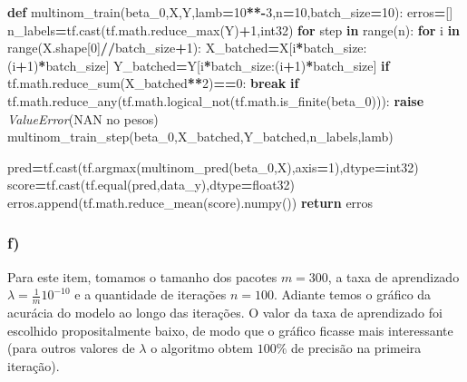 \documentclass[
]{article}
\newenvironment{Shaded}{\begin{snugshade}}{\end{snugshade}}
\newcommand{\BuiltInTok}[1]{#1}
\newcommand{\ControlFlowTok}[1]{\textcolor[rgb]{0.13,0.29,0.53}{\textbf{#1}}}
\newcommand{\DecValTok}[1]{\textcolor[rgb]{0.00,0.00,0.81}{#1}}
\newcommand{\KeywordTok}[1]{\textcolor[rgb]{0.13,0.29,0.53}{\textbf{#1}}}
\newcommand{\NormalTok}[1]{#1}
\newcommand{\OperatorTok}[1]{\textcolor[rgb]{0.81,0.36,0.00}{\textbf{#1}}}
\newcommand{\PreprocessorTok}[1]{\textcolor[rgb]{0.56,0.35,0.01}{\textit{#1}}}
\newcommand{\StringTok}[1]{\textcolor[rgb]{0.31,0.60,0.02}{#1}}
\begin{document}
\begin{Shaded}
\begin{Highlighting}[]
\KeywordTok{def}\NormalTok{ multinom\_train(beta\_0,X,Y,lamb}\OperatorTok{=}\DecValTok{10}\OperatorTok{**{-}}\DecValTok{3}\NormalTok{,n}\OperatorTok{=}\DecValTok{10}\NormalTok{,batch\_size}\OperatorTok{=}\DecValTok{10}\NormalTok{):}
\NormalTok{  erros}\OperatorTok{=}\NormalTok{[]}
\NormalTok{  n\_labels}\OperatorTok{=}\NormalTok{tf.cast(tf.math.reduce\_max(Y)}\OperatorTok{+}\DecValTok{1}\NormalTok{,}\StringTok{\textquotesingle{}int32\textquotesingle{}}\NormalTok{)}
  \ControlFlowTok{for}\NormalTok{ step }\KeywordTok{in} \BuiltInTok{range}\NormalTok{(n):}
    \ControlFlowTok{for}\NormalTok{ i }\KeywordTok{in} \BuiltInTok{range}\NormalTok{(X.shape[}\DecValTok{0}\NormalTok{]}\OperatorTok{//}\NormalTok{batch\_size}\OperatorTok{+}\DecValTok{1}\NormalTok{):}
\NormalTok{      X\_batched}\OperatorTok{=}\NormalTok{X[i}\OperatorTok{*}\NormalTok{batch\_size:(i}\OperatorTok{+}\DecValTok{1}\NormalTok{)}\OperatorTok{*}\NormalTok{batch\_size]}
\NormalTok{      Y\_batched}\OperatorTok{=}\NormalTok{Y[i}\OperatorTok{*}\NormalTok{batch\_size:(i}\OperatorTok{+}\DecValTok{1}\NormalTok{)}\OperatorTok{*}\NormalTok{batch\_size]}
      \ControlFlowTok{if}\NormalTok{ tf.math.reduce\_sum(X\_batched}\OperatorTok{**}\DecValTok{2}\NormalTok{)}\OperatorTok{==}\DecValTok{0}\NormalTok{:}
        \ControlFlowTok{break}
      \ControlFlowTok{if}\NormalTok{ tf.math.reduce\_any(tf.math.logical\_not(tf.math.is\_finite(beta\_0))):}
        \ControlFlowTok{raise} \PreprocessorTok{ValueError}\NormalTok{(}\StringTok{\textquotesingle{}NAN no pesos\textquotesingle{}}\NormalTok{)}
\NormalTok{      multinom\_train\_step(beta\_0,X\_batched,Y\_batched,n\_labels,lamb)}
      
\NormalTok{    pred}\OperatorTok{=}\NormalTok{tf.cast(tf.argmax(multinom\_pred(beta\_0,X),axis}\OperatorTok{=}\DecValTok{1}\NormalTok{),dtype}\OperatorTok{=}\StringTok{\textquotesingle{}int32\textquotesingle{}}\NormalTok{)}
\NormalTok{    score}\OperatorTok{=}\NormalTok{tf.cast(tf.equal(pred,data\_y),dtype}\OperatorTok{=}\StringTok{\textquotesingle{}float32\textquotesingle{}}\NormalTok{)}
\NormalTok{    erros.append(tf.math.reduce\_mean(score).numpy())}
  \ControlFlowTok{return}\NormalTok{ erros}
\end{Highlighting}
\end{Shaded}

\hypertarget{f}{%
\subsubsection{f)}\label{f}}

Para este item, tomamos o tamanho dos pacotes \(m=300\), a taxa de
aprendizado \(\lambda=\frac{1}{m}10^{-10}\) e a quantidade de iterações
\(n=100\). Adiante temos o gráfico da acurácia do modelo ao longo das
iterações. O valor da taxa de aprendizado foi escolhido propositalmente
baixo, de modo que o gráfico ficasse mais interessante (para outros
valores de \(\lambda\) o algoritmo obtem \(100\%\) de precisão na
primeira iteração).
\end{document}
